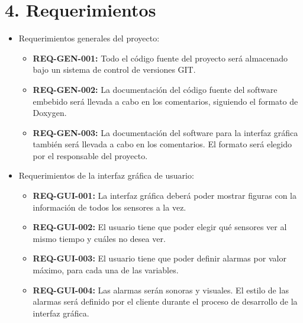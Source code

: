 \documentclass[11pt]{charter}
\begin{document}
\section{4. Requerimientos}
\label{sec:requerimientos}

\begin{itemize}
\item Requerimientos generales del proyecto:
	\begin{itemize}
	\item \textbf{REQ-GEN-001:} Todo el código fuente del proyecto será almacenado bajo un sistema de control de versiones GIT.
	\item \textbf{REQ-GEN-002:} La documentación del código fuente del software embebido será llevada a cabo en los comentarios, siguiendo el formato de Doxygen.
	\item \textbf{REQ-GEN-003:} La documentación del software para la interfaz gráfica también será llevada a cabo en los comentarios. El formato será elegido por el responsable del proyecto.
	\end{itemize}
\item Requerimientos de la interfaz gráfica de usuario:
	\begin{itemize}
	\item \textbf{REQ-GUI-001:} La interfaz gráfica deberá poder mostrar figuras con la información de todos los sensores a la vez.
	\item \textbf{REQ-GUI-002:} El usuario tiene que poder elegir qué sensores ver al mismo tiempo y cuáles no desea ver.
	\item \textbf{REQ-GUI-003:} El usuario tiene que poder definir alarmas por valor máximo, para cada una de las variables.
	\item \textbf{REQ-GUI-004:} Las alarmas serán sonoras y visuales. El estilo de las alarmas será definido por el cliente durante el proceso de desarrollo de la interfaz gráfica.


\end{itemize}
\end{itemize}
\end{document}
